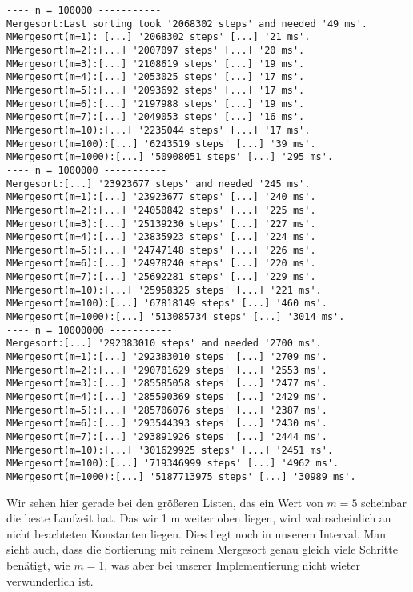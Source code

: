 \documentclass[11pt,a4paper,ngerman]{article}
\begin{document}
\begin{lstlisting}
---- n = 100000 -----------
Mergesort:Last sorting took '2068302 steps' and needed '49 ms'.
MMergesort(m=1): [...] '2068302 steps' [...] '21 ms'.
MMergesort(m=2):[...] '2007097 steps' [...] '20 ms'.
MMergesort(m=3):[...] '2108619 steps' [...] '19 ms'.
MMergesort(m=4):[...] '2053025 steps' [...] '17 ms'.
MMergesort(m=5):[...] '2093692 steps' [...] '17 ms'.
MMergesort(m=6):[...] '2197988 steps' [...] '19 ms'.
MMergesort(m=7):[...] '2049053 steps' [...] '16 ms'.
MMergesort(m=10):[...] '2235044 steps' [...] '17 ms'.
MMergesort(m=100):[...] '6243519 steps' [...] '39 ms'.
MMergesort(m=1000):[...] '50908051 steps' [...] '295 ms'.
---- n = 1000000 -----------
Mergesort:[...] '23923677 steps' and needed '245 ms'.
MMergesort(m=1):[...] '23923677 steps' [...] '240 ms'.
MMergesort(m=2):[...] '24050842 steps' [...] '225 ms'.
MMergesort(m=3):[...] '25139230 steps' [...] '227 ms'.
MMergesort(m=4):[...] '23835923 steps' [...] '224 ms'.
MMergesort(m=5):[...] '24747148 steps' [...] '226 ms'.
MMergesort(m=6):[...] '24978240 steps' [...] '220 ms'.
MMergesort(m=7):[...] '25692281 steps' [...] '229 ms'.
MMergesort(m=10):[...] '25958325 steps' [...] '221 ms'.
MMergesort(m=100):[...] '67818149 steps' [...] '460 ms'.
MMergesort(m=1000):[...] '513085734 steps' [...] '3014 ms'.
---- n = 10000000 -----------
Mergesort:[...] '292383010 steps' and needed '2700 ms'.
MMergesort(m=1):[...] '292383010 steps' [...] '2709 ms'.
MMergesort(m=2):[...] '290701629 steps' [...] '2553 ms'.
MMergesort(m=3):[...] '285585058 steps' [...] '2477 ms'.
MMergesort(m=4):[...] '285590369 steps' [...] '2429 ms'.
MMergesort(m=5):[...] '285706076 steps' [...] '2387 ms'.
MMergesort(m=6):[...] '293544393 steps' [...] '2430 ms'.
MMergesort(m=7):[...] '293891926 steps' [...] '2444 ms'.
MMergesort(m=10):[...] '301629925 steps' [...] '2451 ms'.
MMergesort(m=100):[...] '719346999 steps' [...] '4962 ms'.
MMergesort(m=1000):[...] '5187713975 steps' [...] '30989 ms'.
\end{lstlisting}

Wir sehen hier gerade bei den größeren Listen, das ein Wert von $m=5$ scheinbar die beste Laufzeit hat. Das wir 1 m weiter oben liegen, wird wahrscheinlich an nicht beachteten Konstanten liegen. Dies liegt noch in unserem Interval. Man sieht auch, dass die Sortierung mit reinem Mergesort genau gleich viele Schritte benätigt, wie $m=1$, was aber bei unserer Implementierung nicht wieter verwunderlich ist.

\label{LastPage}
\end{document}
